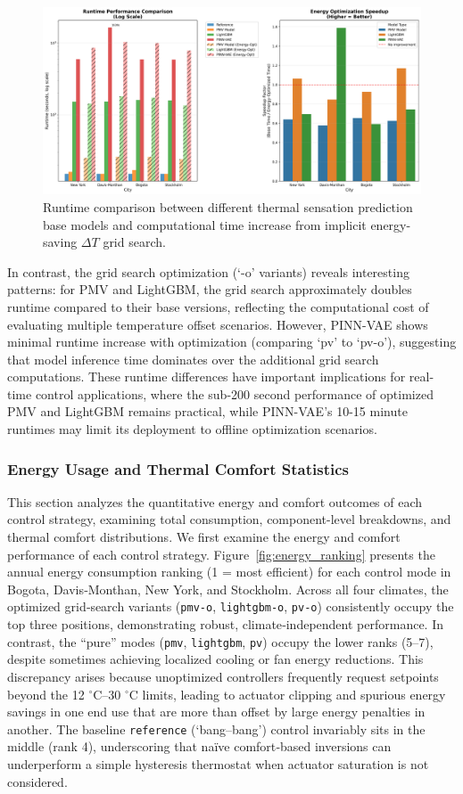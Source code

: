 \begin{figure}[h!]
    \centering
    \includegraphics[width=0.75\linewidth]{figs/runtime.png}
    \caption{Runtime comparison between different thermal sensation prediction base models and computational time increase from implicit energy-saving $\Delta T$ grid search.}
    \label{fig:runtime}
\end{figure}

In contrast, the grid search optimization (`-o' variants) reveals interesting patterns: for PMV and LightGBM, the grid search approximately doubles runtime compared to their base versions, reflecting the computational cost of evaluating multiple temperature offset scenarios. However, PINN-VAE shows minimal runtime increase with optimization (comparing `pv' to `pv-o'), suggesting that model inference time dominates over the additional grid search computations. These runtime differences have important implications for real-time control applications, where the sub-200 second performance of optimized PMV and LightGBM remains practical, while PINN-VAE's 10-15 minute runtimes may limit its deployment to offline optimization scenarios.

\subsubsection{Energy Usage and Thermal Comfort Statistics}
\label{sec:energy_comfort_analysis}
This section analyzes the quantitative energy and comfort outcomes of each control strategy, examining total consumption, component-level breakdowns, and thermal comfort distributions.
We first examine the energy and comfort performance of each control strategy. Figure~\ref{fig:energy_ranking} presents the annual energy consumption ranking (1 = most efficient) for each control mode in Bogota, Davis‐Monthan, New York, and Stockholm. Across all four climates, the optimized grid‐search variants (\texttt{pmv-o}, \texttt{lightgbm-o}, \texttt{pv-o}) consistently occupy the top three positions, demonstrating robust, climate‐independent performance. In contrast, the “pure” modes (\texttt{pmv}, \texttt{lightgbm}, \texttt{pv}) occupy the lower ranks (5–7), despite sometimes achieving localized cooling or fan energy reductions. This discrepancy arises because unoptimized controllers frequently request setpoints beyond the 12 $^\circ$C–30 $^\circ$C limits, leading to actuator clipping and spurious energy savings in one end use that are more than offset by large energy penalties in another. The baseline \texttt{reference} (`bang–bang') control invariably sits in the middle (rank 4), underscoring that naïve comfort‐based inversions can underperform a simple hysteresis thermostat when actuator saturation is not considered.

